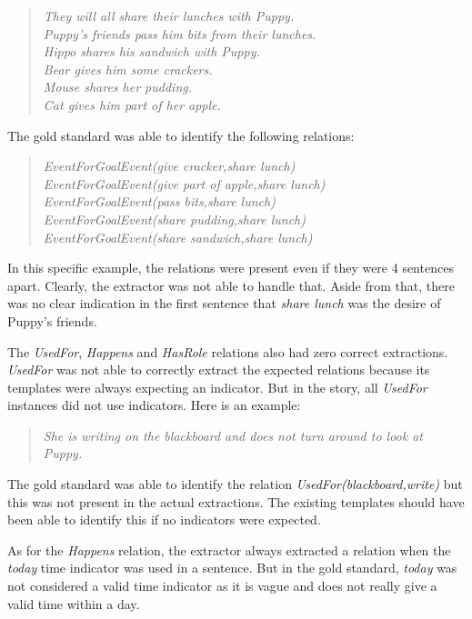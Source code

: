 \begin{verse}
\itshape
They will all share their lunches with Puppy.\\
Puppy's friends pass him bits from their lunches. \\
Hippo shares his sandwich with Puppy. \\
Bear gives him some crackers. \\
Mouse shares her pudding. \\
Cat gives him part of her apple.\\
\end{verse}

The gold standard was able to identify the following relations:

\begin{verse}
\itshape
EventForGoalEvent(give cracker,share lunch)\\
EventForGoalEvent(give part of apple,share lunch)\\
EventForGoalEvent(pass bits,share lunch)\\
EventForGoalEvent(share pudding,share lunch)\\
EventForGoalEvent(share sandwich,share lunch)\\
\end{verse}

In this specific example, the relations were present even if they were 4 sentences apart. Clearly, the extractor was not able to handle that. Aside from that, there was no clear indication in the first sentence that \textit{share lunch} was the desire of Puppy's friends. 

The \textit{UsedFor}, \textit{Happens} and \textit{HasRole} relations also had zero correct extractions. \textit{UsedFor} was not able to correctly extract the expected relations because its templates were always expecting an indicator. But in the story, all \textit{UsedFor} instances did not use indicators. Here is an example:

\begin{verse}
\itshape
She is writing on the blackboard and does not turn around to look at Puppy.
\end{verse}

The gold standard was able to identify the relation \textit{UsedFor(blackboard,write)} but this was not present in the actual extractions. The existing  templates should have been able to identify this if no indicators were expected.

As for the \textit{Happens} relation, the extractor always extracted a relation when the \textit{today} time indicator was used in a sentence. But in the gold standard, \textit{today} was not considered a valid time indicator as it is vague and does not really give a valid time within a day.

